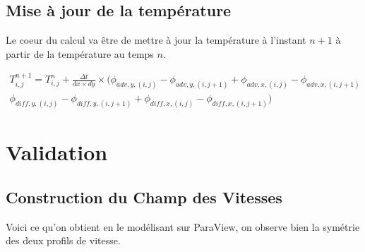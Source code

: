 \documentclass[a4paper,oneside]{article}
\begin{document}
\subsection{Mise à jour de la température}

Le coeur du calcul va être de mettre à jour la température à l'instant $n+1$ à partir de la température au temps $n$.


\begin{multline}

T_{i,j}^{n+1} = T_{i,j}^{n} 	+ \frac{\Delta t}{dx\times dy} \times ( \phi_{adv,y,(i,j)}-\phi_{adv,y,(i,j+1)}+\phi_{adv,x,(i,j)}-\phi_{adv,x,(i,j+1)}\\
\phi_{diff,y,(i,j)}-\phi_{diff,y,(i,j+1)}+\phi_{diff,x,(i,j)}-\phi_{diff,x,(i,j+1)} )
\end{multline}


%



\clearpage



\section{Validation}

\subsection{Construction du Champ des Vitesses}

Voici ce qu'on obtient en le modélisant sur ParaView, on observe bien la symétrie des deux profils de vitesse.
\end{document}
